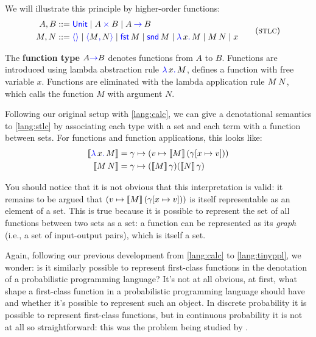 We will illustrate this principle by higher-order functions:
\begin{gather}
  \begin{aligned}
   A,B &::= \plkw{Unit}
     \mid A \pltimes B
     \mid A \plto B
  \\
  M,N &::= \plunit{}
      \mid \plpair{M}{N}
      \mid \plfst{M}
      \mid \plsnd{M}
      \mid \pllam{x}{M}
      \mid \plapp{M}{N}
      \mid x
  \end{aligned}
  \label{lang:stlc}
  \tag{\textsc{stlc}}
\end{gather}

The \textbf{function type} $A \mathsf{{\color{blue}\to}} B$ denotes functions from $A$ 
to $B$. Functions are introduced using lambda abstraction rule ${\color{blue}\lambda}\,x{\color{blue}.}\,M$, defines a function 
with free variable $x$. Functions are eliminated with the lambda 
application rule $M\,N$, which calls the function $M$ with argument $N$.

Following our original setup with \ref{lang:calc}, we can give a denotational 
semantics to \ref{lang:stlc} by associating each type with a set and each 
term with a function between sets. For functions and function applications, this
looks like:
\begin{align*}
   \left\llbracket {\color{blue}\lambda}\,x{\color{blue}.}\,M\right\rrbracket &= \gamma \mapsto (v \mapsto \left\llbracket M\right\rrbracket(\gamma[x \mapsto v])) \\
  \left\llbracket M\,N\right\rrbracket &= \gamma \mapsto (\left\llbracket M\right\rrbracket\gamma)(\left\llbracket N\right\rrbracket\gamma)
\end{align*}

You should notice that it is not obvious that this interpretation is valid: 
it remains to be argued that $(v \mapsto \left\llbracket M\right\rrbracket(\gamma[x \mapsto v]))$
is itself representable as an element of a set. 
This is true because it is possible to represent the set of all functions 
between two sets as a set: a function can be represented as its \emph{graph} (i.e., 
a set of input-output pairs), which is itself a set.

Again, following our previous development from \ref{lang:calc} to \ref{lang:tinyppl},
we wonder: is it similarly possible to represent first-class functions in 
the denotation of a probabilistic programming language? It's not at all obvious, 
at first, what shape a first-class function in a probabilistic programming 
language should have and whether it's possible to represent such an object.
In discrete probability it is possible to represent first-class functions, 
but in continuous probability it is not at all so straightforward: this was the 
problem being studied by \citep{heunen2017convenient}.


